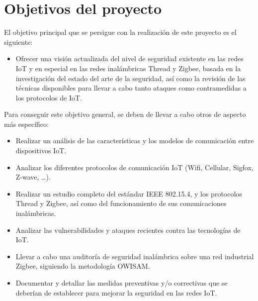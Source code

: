\section{Objetivos del proyecto} %
\vspace{0.5cm}
El objetivo principal que se persigue con la realización de este proyecto es el siguiente:
\begin{itemize}
\item Ofrecer una visión actualizada del nivel de seguridad existente en las redes IoT y en especial en las redes inalámbricas Thread y Zigbee, basada en la investigación del estado del arte de la seguridad, así como la revisión de las técnicas disponibles para llevar a cabo tanto ataques como contramedidas a los protocolos de IoT.
\end{itemize}
\vspace{0.7cm}

Para conseguir este objetivo general, se deben de llevar a cabo otros de aspecto más específico:
\begin{itemize}
\item Realizar un análisis de las características y los modelos de comunicación entre dispositivos IoT.
\item Analizar los diferentes protocolos de comunicación IoT (Wifi, Cellular, Sigfox, Z-wave, …).
\item Realizar un estudio completo del estándar IEEE 802.15.4, y los protocolos Thread y Zigbee, así como del funcionamiento de sus comunicaciones inalámbricas.
\item Analizar las vulnerabilidades y ataques recientes contra las tecnologías de IoT.
\item Llevar a cabo una auditoría de seguridad inalámbrica sobre una red industrial Zigbee, siguiendo la metodología OWISAM.
\item Documentar y detallar las medidas preventivas y/o correctivas que se deberían de establecer para mejorar la seguridad en las redes IoT.
\end{itemize}
\clearpage




